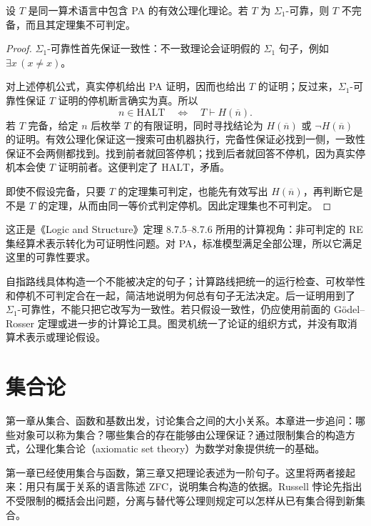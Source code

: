 \documentclass[lang=cn,a4paper,fontset=none,zihao=false,10pt,openany,twoside]{beautybook}
\numberwithin{algorithm}{chapter}
\begin{document}
\begin{theorem}[计算途径的不完备性]
设 $T$ 是同一算术语言中包含 PA 的有效公理化理论。若 $T$ 为 $\Sigma_1$-可靠，则 $T$ 不完备，而且其定理集不可判定。
\end{theorem}
\begin{proof}
$\Sigma_1$-可靠性首先保证一致性：不一致理论会证明假的 $\Sigma_1$ 句子，例如 $\exists x\,(x\ne x)$。

对上述停机公式，真实停机给出 PA 证明，因而也给出 $T$ 的证明；反过来，$\Sigma_1$-可靠性保证 $T$ 证明的停机断言确实为真。所以
\[
 n\in\mathrm{HALT}\quad\Longleftrightarrow\quad T\vdash H(\overline n).
\]
若 $T$ 完备，给定 $n$ 后枚举 $T$ 的有限证明，同时寻找结论为 $H(\overline n)$ 或 $\neg H(\overline n)$ 的证明。有效公理化保证这一搜索可由机器执行，完备性保证必找到一侧，一致性保证不会两侧都找到。找到前者就回答停机；找到后者就回答不停机，因为真实停机本会使 $T$ 证明前者。这便判定了 $\mathrm{HALT}$，矛盾。

即使不假设完备，只要 $T$ 的定理集可判定，也能先有效写出 $H(\overline n)$，再判断它是不是 $T$ 的定理，从而由同一等价式判定停机。因此定理集也不可判定。
\end{proof}

\begin{remark}[两条路线的联系]
这正是《Logic and Structure》定理 8.7.5--8.7.6 所用的计算视角：非可判定的 RE 集经算术表示转化为可证明性问题。对 PA，标准模型满足全部公理，所以它满足这里的可靠性要求。

自指路线具体构造一个不能被决定的句子；计算路线把统一的运行检查、可枚举性和停机不可判定合在一起，简洁地说明为何总有句子无法决定。后一证明用到了 $\Sigma_1$-可靠性，不能只把它改写为一致性。若只假设一致性，仍应使用前面的 Gödel--Rosser 定理或进一步的计算论工具。图灵机统一了论证的组织方式，并没有取消算术表示或理论假设。
\end{remark}

\chapter{集合论}\label{chap:zfc}
\begin{wenxintishi}
第一章从集合、函数和基数出发，讨论集合之间的大小关系。本章进一步追问：哪些对象可以称为集合？哪些集合的存在能够由公理保证？通过限制集合的构造方式，公理化集合论（axiomatic set theory）为数学对象提供统一的基础。
\end{wenxintishi}
第一章已经使用集合与函数，第三章又把理论表述为一阶句子。这里将两者接起来：用只有属于关系的语言陈述 ZFC，说明集合构造的依据。Russell 悖论先指出不受限制的概括会出问题，分离与替代等公理则规定可以怎样从已有集合得到新集合。
\end{document}
